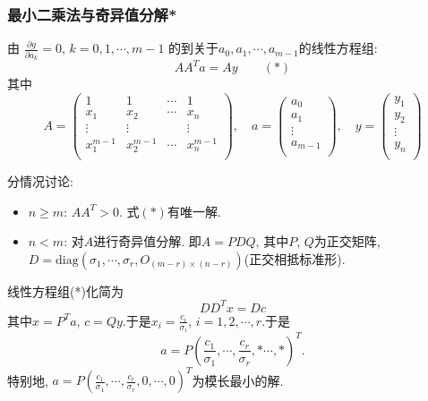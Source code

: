 \begin{frame}\frametitle{最小二乘法与奇异值分解*}
    由 $\frac{\partial g}{\partial a_k}=0$, $k=0,1,\cdots,m-1$ 的到关于$a_0,a_1,\cdots,a_{m-1}$的线性方程组:
    \[AA^Ta=Ay \qquad (*)\]
    其中
    \begin{equation*}
    A=\begin{pmatrix}
    1&1&\cdots&1\\x_1&x_2&\cdots&x_n\\\vdots&\vdots&&\vdots\\x_1^{m-1}&x_2^{m-1}&\cdots&x_n^{m-1}\\
    \end{pmatrix},
    \quad
    a=\begin{pmatrix}a_0\\a_1\\\vdots\\a_{m-1}\\\end{pmatrix},
    \quad
    y=\begin{pmatrix}y_1\\y_2\\\vdots\\y_{n}\\\end{pmatrix}
    \end{equation*}

    分情况讨论:

    \begin{itemize}
    \item $n\geq m$: $AA^T>0$. 式$(*)$有唯一解.
    \item $n<m$: 对$A$进行奇异值分解. 即$A=PDQ$, 其中$P$, $Q$为正交矩阵, $D=\mathrm{diag}(\sigma_1,\cdots,\sigma_r,O_{(m-r)\times(n-r)})$(正交相抵标准形).
    \end{itemize}
    线性方程组(*)化简为
    \[DD^Tx=Dc\]
    其中$x=P^Ta$, $c=Qy$.于是$x_i = \frac{c_i}{\sigma_i}$, $i=1,2,\cdots,r$.于是
    \[a = P\left(\frac{c_1}{\sigma_1},\cdots,\frac{c_r}{\sigma_r},*\cdots,*\right)^T.\]
    特别地, $a=P\left(\frac{c_1}{\sigma_1},\cdots,\frac{c_r}{\sigma_r},0,\cdots,0\right)^T$为模长最小的解.
    \end{frame}






